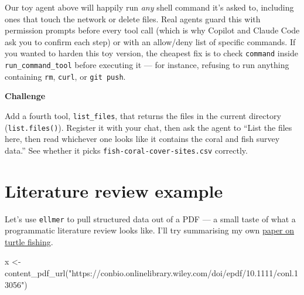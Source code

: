 \documentclass[
  letterpaper,
  DIV=11,
  numbers=noendperiod]{scrreprt}
\newenvironment{Shaded}{\begin{snugshade}}{\end{snugshade}}
\newcommand{\FunctionTok}[1]{\textcolor[rgb]{0.28,0.35,0.67}{#1}}
\newcommand{\NormalTok}[1]{\textcolor[rgb]{0.00,0.23,0.31}{#1}}
\newcommand{\OtherTok}[1]{\textcolor[rgb]{0.00,0.23,0.31}{#1}}
\newcommand{\StringTok}[1]{\textcolor[rgb]{0.13,0.47,0.30}{#1}}
\begin{document}
Our toy agent above will happily run \emph{any} shell command it's asked
to, including ones that touch the network or delete files. Real agents
guard this with permission prompts before every tool call (which is why
Copilot and Claude Code ask you to confirm each step) or with an
allow/deny list of specific commands. If you wanted to harden this toy
version, the cheapest fix is to check \texttt{command} inside
\texttt{run\_command\_tool} before executing it --- for instance,
refusing to run anything containing \texttt{rm}, \texttt{curl}, or
\texttt{git\ push}.

\begin{tcolorbox}[enhanced jigsaw, toprule=.15mm, rightrule=.15mm, left=2mm, leftrule=.75mm, breakable, opacityback=0, arc=.35mm, colframe=quarto-callout-important-color-frame, bottomrule=.15mm, colback=white]
\begin{minipage}[t]{5.5mm}
\textcolor{quarto-callout-important-color}{\faExclamation}
\end{minipage}%
\begin{minipage}[t]{\textwidth - 5.5mm}

\vspace{-3mm}\textbf{Challenge}\vspace{3mm}

Add a fourth tool, \texttt{list\_files}, that returns the files in the
current directory (\texttt{list.files()}). Register it with your chat,
then ask the agent to ``List the files here, then read whichever one
looks like it contains the coral and fish survey data.'' See whether it
picks \texttt{fish-coral-cover-sites.csv} correctly.

\end{minipage}%
\end{tcolorbox}

\chapter{Literature review example}\label{literature-review-example}

Let's use \texttt{ellmer} to pull structured data out of a PDF --- a
small taste of what a programmatic literature review looks like. I'll
try summarising my own
\href{https://conbio.onlinelibrary.wiley.com/doi/10.1111/conl.13056}{paper
on turtle fishing}.

\begin{Shaded}
\begin{Highlighting}[]
\NormalTok{x }\OtherTok{\textless{}{-}} \FunctionTok{content\_pdf\_url}\NormalTok{(}\StringTok{"https://conbio.onlinelibrary.wiley.com/doi/epdf/10.1111/conl.13056"}\NormalTok{)}
\end{Highlighting}
\end{Shaded}
\end{document}
